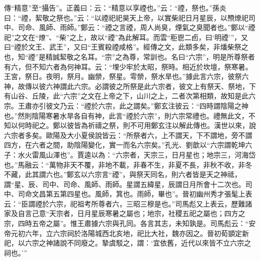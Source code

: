 {\noindent\zhuan{}\fzbyks 傳“精意”至“攝告”。正義曰：云：“精意以享禋也。”云：“禋，祭也。”孫炎曰：“禋，絜敬之祭也。”云：“以禋祀祀昊天上帝，以實柴祀日月星辰，以槱燎祀司中、司命、風師、雨師。”鄭云：“禋之言禋，周人尚臭，煙氣之臭聞者也。”鄭以“禋祀”之文在“燎”、“柴”之上，故以“禋”為此解耳。而雲“秬鬯二卣，曰‘明禋’”，又曰“禋於文王、武王”，又曰“王賓殺禋咸格”。經傳之文，此類多矣，非燔柴祭之也，知“禋”是精誠絜敬之名耳。“宗”之為尊，常訓也。名曰“六宗”，明是所尊祭者有六，但不知六者為何神耳。云：“埋少牢於太昭，祭時。相近於坎壇，祭寒暑。王宮，祭日。夜明，祭月。幽禜，祭星。雩禜，祭水旱也。”據此言六宗，彼祭六神，故傳以彼六神謂此六宗。必謂彼之所祭是此六宗者，彼文上有祭天、祭地，下有山谷、丘陵，此“六宗”之文在上帝之下，山川之上，二者次第相類，故知是此六宗。王肅亦引彼文乃云：“禋於六宗，此之謂矣。”鄭玄注彼云：“四時謂陰陽之神也。”然則陰陽寒暑水旱各自有神，此言“禋於六宗”，則六宗常禮也。禮無此文，不知以何時祀之。鄭以彼皆為祈禱之祭，則不可用鄭玄注以解此傳也。漢世以來，說六宗者多矣。歐陽及大小夏侯說皆云：“所祭者六，上不謂天，下不謂地，旁不謂四方，在六者之間，助陰陽變化，實一而名六宗矣。”孔光、劉歆以“六宗謂乾坤六子：水火雷風山澤也”。賈逵以為：“六宗者，天宗三，日月星也；地宗三，河海岱也。”馬融云：“萬物非天不覆，非地不載，非春不生，非夏不長，非秋不收，非冬不藏，此其謂六也。”鄭玄以六宗言“禋”，與祭天同名，則六者皆是天之神祗，謂“星、辰、司中、司命、風師、雨師。星謂五緯星，辰謂日月所會十二次也。司中、司命文昌第五第四星也。風師，箕也。雨師，畢也”。晉初幽州秀才張髦上表云：“臣謂禋於六宗，祀祖考所尊者六，三昭三穆是也。”司馬彪又上表云，歷難諸家及自言己意“天宗者，日月星辰寒暑之屬也；地宗，社稷五祀之屬也；四方之宗，四時五帝之屬”。惟王肅據六宗與孔同。各言其志，未知孰是。司馬彪云：“安帝元初六年，立六宗祠於洛陽城西北亥地，祀比大社，魏亦因之。晉初荀顗定新祀，以六宗之神諸說不同廢之。摯虞駁之，謂：‘宜依舊，近代以來皆不立六宗之祠也。’” \par}

